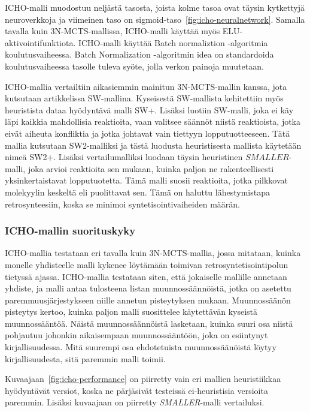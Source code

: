 \documentclass[finnish,twoside,censored,tkt,sw-line]{HYthesisML}
\begin{document}
ICHO-malli muodostuu neljästä tasosta, joista kolme tasoa ovat täysin kytkettyjä neuroverkkoja ja viimeinen taso on sigmoid-taso~\ref{fig:icho-neuralnetwork}.
Samalla tavalla kuin 3N-MCTS-mallissa, ICHO-malli käyttää myös ELU-aktivointifunktiota.
ICHO-malli käyttää Batch normaliztion -algoritmia koulutusvaiheessa.
Batch Normalization -algoritmin idea on standardoida koulutusvaiheessa tasolle tuleva syöte, jolla verkon painoja muutetaan.

ICHO-mallia vertailtiin aikasiemmin mainitun 3N-MCTS-mallin kanssa, jota kutsutaan artikkelissa SW-mallina.
Kyseisestä SW-mallista kehitettiin myös heuristista dataa hyödyntävä malli SW+.
Lisäksi luotiin SW-malli, joka ei käy läpi kaikkia mahdollisia reaktioita, vaan valitsee säännöt niistä reaktioista, jotka eivät aiheuta konfliktia ja jotka johtavat vain tiettyyn lopputuotteeseen.
Tätä mallia kutsutaan SW2-malliksi ja tästä luodusta heuristisesta mallista käytetään nimeä SW2+.
Lisäksi vertailumalliksi luodaan täysin heuristinen \(SMALLER\)-malli, joka arvioi reaktioita sen mukaan, kuinka paljon ne rakenteellisesti yksinkertaistavat lopputuotetta.
Tämä malli suosii reaktioita, jotka pilkkovat molekyylin keskeltä eli puolittavat sen.
Tämä on haluttu lähestymistapa retrosynteesiin, koska se minimoi syntetisointivaiheiden määrän.

\subsubsection{ICHO-mallin suorituskyky}

ICHO-mallia testataan eri tavalla kuin 3N-MCTS-mallia, jossa mitataan, kuinka monelle yhdisteelle malli kykenee löytämään toimivan retrosyntetisointipolun tietyssä ajassa.
ICHO-mallia testataan siten, että jokaiselle mallille annetaan yhdiste, ja malli antaa tulosteena listan muunnossäännöistä, jotka on asetettu paremmuusjärjestykseen niille annetun pisteytyksen mukaan.
Muunnossäänön pisteytys kertoo, kuinka paljon malli suosittelee käytettävän kyseistä muunnossääntöä.
Näistä muunnossäännöistä lasketaan, kuinka suuri osa niistä pohjautuu johonkin aikaisempaan muunnossääntöön, joka on esiintynyt kirjallisuudessa.
Mitä suurempi osa ehdotetuista muunnossäänöistä löytyy kirjallisuudesta, sitä paremmin malli toimii.

Kuvaajaan~\ref{fig:icho-performance} on piirretty vain eri mallien heuristiikkaa hyödyntävät versiot, koska ne pärjäsivät testeissä ei-heuristisia versioita paremmin.
Lisäksi kuvaajaan on piirretty \emph{SMALLER}-malli vertailuksi.
\end{document}
